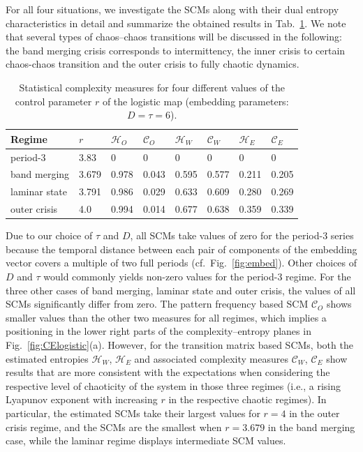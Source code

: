 \documentclass[12pt,aip,cha,reprint,nofootinbib]{revtex4-1}
\begin{document}
For all four situations, we investigate the SCMs along with their dual entropy characteristics in detail and summarize the obtained results in Tab.~\ref{tableLog}. We note that several types of chaos--chaos transitions will be discussed in the following: the band merging crisis corresponds to intermittency, the inner crisis to certain chaos-chaos transition and the outer crisis to fully chaotic dynamics. 

\begin{table}[htb]
    {\begin{tabular}{l  l  l  l  l  l  l  l}
    \hline
    Regime & $r$      & $\mathcal{H}_O$ & $\mathcal{C}_O$ & $\mathcal{H}_W$ & $\mathcal{C}_W$ & $\mathcal{H}_E$   & $\mathcal{C}_E$  \\
    \hline
    period-3      & 3.83 & 0 & 0 & 0 & 0 & 0 & 0 \\
    \hline
    band merging    & 3.679 & 0.978 & 0.043 & 0.595 & 0.577 & 0.211 & 0.205  \\
    \hline
    laminar state    & 3.791 & 0.986 & 0.029 & 0.633 & 0.609 & 0.280 & 0.269 \\
    \hline
    outer crisis  & 4.0 & 0.994 & 0.014 & 0.677 & 0.638 & 0.359 & 0.339 \\
    \hline
    \end{tabular}}
   \caption{Statistical complexity measures for four different values of the control parameter $r$ of the logistic map (embedding parameters: $D = \tau = 6$).   \label{tableLog}}    
\end{table}

Due to our choice of $\tau$ and $D$, all SCMs take values of zero for the period-3 series because the temporal distance between each pair of components of the embedding vector covers a multiple of two full periods (cf.~Fig.~\ref{fig:embed}). Other choices of $D$ and $\tau$ would commonly yields non-zero values for the period-3 regime. For the three other cases of band merging, laminar state and outer crisis, the values of all SCMs significantly differ from zero. The pattern frequency based SCM $\mathcal{C}_O$ shows smaller values than the other two measures for all regimes, which implies a positioning in the lower right parts of the complexity--entropy planes in Fig.~\ref{fig:CElogistic}(a). However, for the transition matrix based SCMs, both the estimated entropies $\mathcal{H}_W$, $\mathcal{H}_E$ and associated complexity measures $\mathcal{C}_W$, $\mathcal{C}_E$ show results that are more consistent with the expectations when considering the respective level of chaoticity of the system in those three regimes (i.e., a rising Lyapunov exponent with increasing $r$ in the respective chaotic regimes). In particular, the estimated SCMs take their largest values for $r = 4$ in the outer crisis regime, and the SCMs are the smallest when $r = 3.679$ in the band merging case, while the laminar regime displays intermediate SCM values. 
\end{document}
